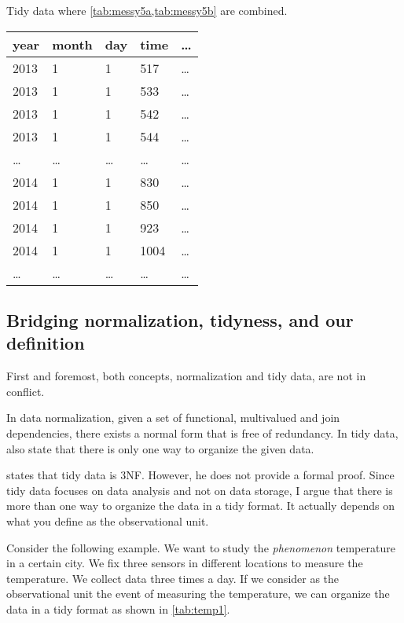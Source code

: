 \begin{tablebox}[label=tab:tidy5]{Tidy data where \cref{tab:messy5a,tab:messy5b} are combined.}
  \centering
  \begin{tabular}{lllll}
    \toprule
    year & month & day & time & \dots \\
    \midrule
    2013 & 1 & 1 & 517 & \dots \\
    2013 & 1 & 1 & 533 & \dots \\
    2013 & 1 & 1 & 542 & \dots \\
    2013 & 1 & 1 & 544 & \dots \\
    \dots & \dots & \dots & \dots & \dots \\
    2014 & 1 & 1 & 830 & \dots \\
    2014 & 1 & 1 & 850 & \dots \\
    2014 & 1 & 1 & 923 & \dots \\
    2014 & 1 & 1 & 1004 & \dots \\
    \dots & \dots & \dots & \dots & \dots \\
    \bottomrule
  \end{tabular}
\end{tablebox}

\subsection{Bridging normalization, tidyness, and our definition}
\label{sub:bridge}

First and foremost, both concepts, normalization and tidy data, are not in conflict.

In data normalization, given a set of functional, multivalued and join dependencies, there
exists a normal form that is free of redundancy.  In tidy data,
\citeauthor{Wickham2023} also state that there is only one way to organize the given data.

\textcite{Wickham2014} states that tidy data is 3NF.  However, he does not provide a
formal proof.  Since tidy data focuses on data analysis and not on data storage, I argue
that there is more than one way to organize the data in a tidy format.  It actually
depends on what you define as the observational unit.

Consider the following example.  We want to study the \emph{phenomenon} temperature in a
certain city.  We fix three sensors in different locations to measure the temperature.  We
collect data three times a day.  If we consider as the observational unit the
event of measuring the temperature, we can organize the data in a tidy format as shown in
\cref{tab:temp1}.

